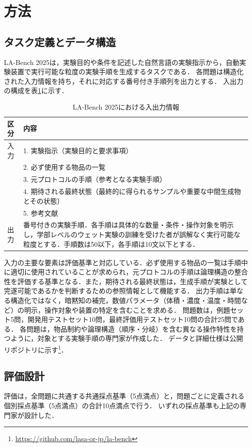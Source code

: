 \documentclass[twocolumn]{jarticle}
\begin{document}
\section{方法}
\subsection{タスク定義とデータ構造}
LA-Bench 2025は，実験目的や条件を記述した自然言語の実験指示から，自動実験装置で実行可能な粒度の実験手順を生成するタスクである．
各問題は構造化された入力情報を持ち，それに対応する番号付き手順列を出力とする．
入出力の構成を表\ref{tab:io_format}に示す．
\begin{table}[t]
    \centering
    \caption{LA-Bench 2025における入出力情報}
    \label{tab:io_format}
    \begin{tabular}{lp{6.5cm}}
    \toprule
    区分 & 内容 \\
    \midrule
    入力 & 1. 実験指示（実験目的と要求事項）\\
    & 2. 必ず使用する物品の一覧 \\
    & 3. 元プロトコルの手順（参考となる実験手順）\\
    & 4. 期待される最終状態（最終的に得られるサンプルや重要な中間生成物とその状態）\\
    & 5. 参考文献 \\
    \midrule
    出力 & 番号付きの実験手順．各手順は具体的な数量・条件・操作対象を明示し，学部レベルのウェット実験の訓練を受けた者が誤解なく実行可能な粒度とする．手順数は50以下，各手順は10文以下とする．\\
    \bottomrule
    \end{tabular}
\end{table}
入力の主要な要素は評価基準と対応している．必ず使用する物品の一覧は手順中に適切に使用されていることが求められ，元プロトコルの手順は論理構造の整合性を評価する基準となる．また，期待される最終状態は，生成手順が実験として完遂可能であるかを判断するための参照情報として機能する．
出力手順は単なる構造化ではなく，暗黙知の補完，数値パラメータ（体積・濃度・温度・時間など）の明示，操作対象や装置の特定を含むことを求める．
問題数は，例題セット5問，開発用テストセット10問，最終評価用テストセット10問の合計25問である．
各問題は，物品制約や論理構造（順序・分岐）を含む異なる操作特性を持つように，対象とする実験手順の専門家が作成した．
データと詳細仕様は公開リポジトリに示す\footnote{\url{https://github.com/lasa-or-jp/la-bench}}．

\subsection{評価設計}
評価は，全問題に共通する共通採点基準（5点満点）と，問題ごとに定義される個別採点基準（5点満点）の合計10点満点で行う．
いずれの採点基準も上記の専門家が設計した．
\end{document}
